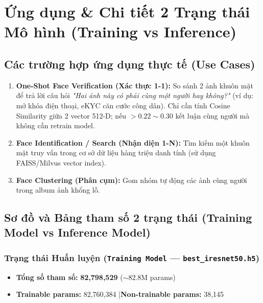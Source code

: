 \documentclass[11pt,a4paper]{article}
\begin{document}
\section{Ứng dụng \& Chi tiết 2 Trạng thái Mô hình (Training vs Inference)}

\subsection{Các trường hợp ứng dụng thực tế (Use Cases)}
\begin{enumerate}
    \item \textbf{One-Shot Face Verification (Xác thực 1-1):} So sánh 2 ảnh khuôn mặt để trả lời câu hỏi \textit{"Hai ảnh này có phải cùng một người hay không?"} (ví dụ: mở khóa điện thoại, eKYC căn cước công dân). Chỉ cần tính Cosine Similarity giữa 2 vector 512-D; nếu $> 0.22 \sim 0.30$ kết luận cùng người mà không cần retrain model.
    \item \textbf{Face Identification / Search (Nhận diện 1-N):} Tìm kiếm một khuôn mặt truy vấn trong cơ sở dữ liệu hàng triệu danh tính (sử dụng FAISS/Milvus vector index).
    \item \textbf{Face Clustering (Phân cụm):} Gom nhóm tự động các ảnh cùng người trong album ảnh khổng lồ.
\end{enumerate}

\subsection{Sơ đồ và Bảng tham số 2 trạng thái (Training Model vs Inference Model)}

\subsubsection{Trạng thái Huấn luyện (\texttt{Training Model} --- \texttt{best\_iresnet50.h5})}
\begin{itemize}
    \item \textbf{Tổng số tham số:} \textbf{82,798,529} ($\sim$82.8M params)
    \item \textbf{Trainable params:} 82,760,384 \quad|\quad \textbf{Non-trainable params:} 38,145
\end{itemize}
\end{document}
